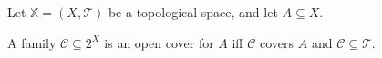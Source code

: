 \begin{definition}
	Let $\mathbb X = (X, \mathcal T)$ be a topological space, and let $A \subseteq X$.
	
	A family $\mathcal C \subseteq 2^X$ is an open cover for $A$ iff $\mathcal C$ covers $A$ and $\mathcal C \subseteq \mathcal T$.
\end{definition}
































%